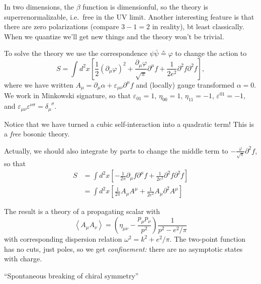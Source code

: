 In two dimensions, the $\beta$ function is dimensionful, so the theory is superrenormalizable, i.e.~free in the UV limit.
Another interesting feature is that there are zero polarizations (compare $3-1 = 2$ in reality), bt least classically.
When we quantize we'll get new things and the theory won't be trivial.

To solve the theory we use the correspondence $\psi \bar \psi \corresponds \varphi$  to change the action to
\[
S = \int d^2 x \left [ \frac{1}{2} (\partial_\mu \varphi)^2 + \frac{\partial_\mu \varphi}{\sqrt \pi} \partial^\mu f + \frac{1}{2e^2} \partial^2 f \partial^2 f\right],
\]
where we have written $A_\mu = \partial_\mu \alpha + \varepsilon_{\mu \nu} \partial^\mu f$ and (locally) gauge transformed $\alpha = 0$.
We work in Minkowski signature, so that $\varepsilon_{01} = 1$, $\eta_{00} = 1$, $\eta_{11} = -1$, $\varepsilon^{01} = -1$, and $\varepsilon_{\mu \nu} \varepsilon^{\nu \sigma} = \delta_\mu^{\phantom{\mu} \sigma}$.

Notice that we have turned a cubic self-interaction into a quadratic term!
This is a \emph{free} bosonic theory.

Actually, we should also integrate by parts to change the middle term to $- \frac{\varphi}{\sqrt \pi} \partial^2 f$, so that
\begin{align*}
S &= \int d^2 x \left[ - \frac{1}{2 \pi} \partial_\mu f \partial^\mu f + \frac{1}{2e^2} \partial^2 f \partial^2 f\right]\\
&= \int d^2 x \left[ \frac{1}{2 \pi} A_\mu A^\mu + \frac{1}{2e^2} A_\mu \partial^2 A^\mu\right]
\end{align*}

The result is a theory of a propagating scalar with
\[
\left \langle A_\mu A_\nu \right \rangle = \left( \eta_{\mu \nu} - \frac{p_\mu p_\nu}{p^2} \right) \frac{1}{p^2 - e^2/\pi}
\]
with corresponding dispersion relation $\omega^2 = k^2 + e^2/\pi$.
The two-point function has no cuts, just poles, so we get \emph{confinement:} there are no asymptotic states with charge.

``Spontaneous breaking of chiral symmetry'' 
